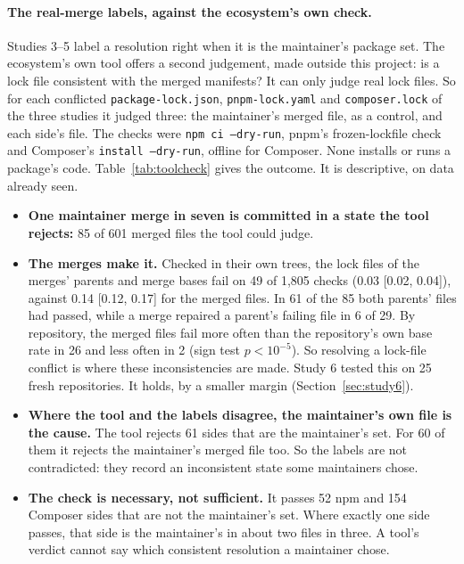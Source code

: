 \documentclass[11pt]{article}
\newcommand{\code}[1]{\texttt{#1}}
\begin{document}
\paragraph{The real-merge labels, against the ecosystem's own check.}
Studies 3--5 label a resolution right when it is the maintainer's package set. The ecosystem's
own tool offers a second judgement, made outside this project: is a lock file consistent with
the merged manifests? It can only judge real lock files. So for each conflicted
\code{package-lock.json}, \code{pnpm-lock.yaml} and \code{composer.lock} of the three studies it
judged three: the maintainer's merged file, as a control, and each side's file. The checks were
\code{npm ci --dry-run}, pnpm's frozen-lockfile check and Composer's \code{install --dry-run},
offline for Composer. None installs or runs a package's code.
Table~\ref{tab:toolcheck} gives the outcome. It is descriptive, on data already seen.

\begin{table}[t]
\centering
\caption{The ecosystem's own consistency check on studies 3--5's conflicted lock files
(exploratory). ``No verdict'': the tool failed for another reason, such as a peer-dependency
conflict or a registry refusal. The side columns count sides with a verdict; ``one side passes''
counts files where exactly one side does.}
\label{tab:toolcheck}
\resizebox{\linewidth}{!}{}
\end{table}

\begin{itemize}
  \item \textbf{One maintainer merge in seven is committed in a state the tool rejects:} 85 of
  601 merged files the tool could judge.
  \item \textbf{The merges make it.} Checked in their own trees, the lock files of the merges'
  parents and merge bases fail on 49 of 1{,}805 checks (0.03 [0.02, 0.04]), against 0.14
  [0.12, 0.17] for the merged files. In 61 of the 85 both parents' files had passed, while a
  merge repaired a parent's failing file in 6 of 29. By repository, the merged files fail more
  often than the repository's own base rate in 26 and less often in 2 (sign test $p<10^{-5}$).
  So resolving a lock-file conflict is where these inconsistencies are made. Study 6 tested
  this on 25 fresh repositories. It holds, by a smaller margin (Section~\ref{sec:study6}).
  \item \textbf{Where the tool and the labels disagree, the maintainer's own file is the cause.}
  The tool rejects 61 sides that are the maintainer's set. For 60 of them it rejects the
  maintainer's merged file too. So the labels are not contradicted: they record an
  inconsistent state some maintainers chose.
  \item \textbf{The check is necessary, not sufficient.} It passes 52 npm and 154 Composer sides
  that are not the maintainer's set. Where exactly one side passes, that side is the
  maintainer's in about two files in three. A tool's verdict cannot say which consistent
  resolution a maintainer chose.
\end{itemize}
\end{document}
